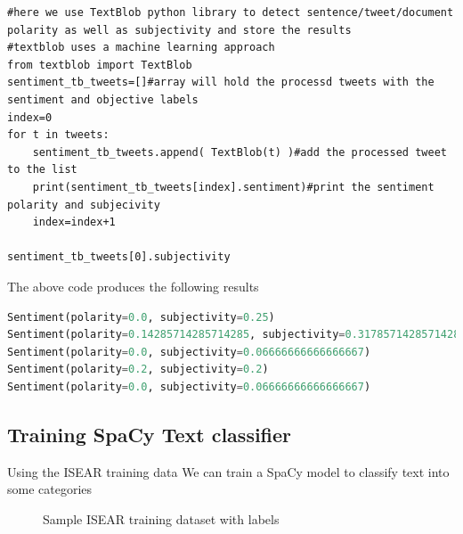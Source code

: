 \begin{lstlisting}
#here we use TextBlob python library to detect sentence/tweet/document polarity as well as subjectivity and store the results
#textblob uses a machine learning approach
from textblob import TextBlob
sentiment_tb_tweets=[]#array will hold the processd tweets with the sentiment and objective labels
index=0
for t in tweets:
    sentiment_tb_tweets.append( TextBlob(t) )#add the processed tweet to the list
    print(sentiment_tb_tweets[index].sentiment)#print the sentiment polarity and subjecivity
    index=index+1
    
sentiment_tb_tweets[0].subjectivity
\end{lstlisting}


The above code produces the following results


\begin{lstlisting}[language=Python]
Sentiment(polarity=0.0, subjectivity=0.25)
Sentiment(polarity=0.14285714285714285, subjectivity=0.31785714285714284)
Sentiment(polarity=0.0, subjectivity=0.06666666666666667)
Sentiment(polarity=0.2, subjectivity=0.2)
Sentiment(polarity=0.0, subjectivity=0.06666666666666667)
\end{lstlisting}

\clearpage

\subsection{Training SpaCy Text classifier}
Using the ISEAR training data
We can train a SpaCy model to classify text into some categories
\begin{figure}[h]
  \centering
  \caption{Sample ISEAR training dataset with labels}
  \label{fig:ALAP:sm1}
\end{figure}

